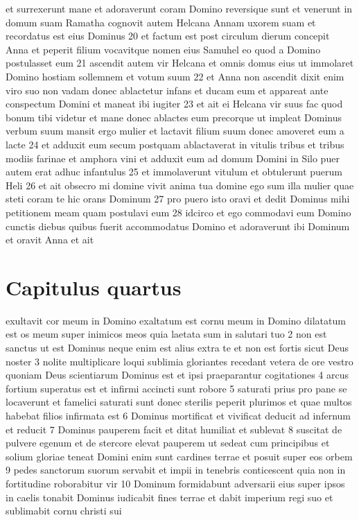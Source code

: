  et surrexerunt mane et adoraverunt coram Domino reversique sunt et venerunt in domum suam Ramatha cognovit autem Helcana Annam uxorem suam et recordatus est eius Dominus  20 et factum est post circulum dierum concepit Anna et peperit filium vocavitque nomen eius Samuhel eo quod a Domino postulasset eum  21 ascendit autem vir Helcana et omnis domus eius ut immolaret Domino hostiam sollemnem et votum suum  22 et Anna non ascendit dixit enim viro suo non vadam donec ablactetur infans et ducam eum et appareat ante conspectum Domini et maneat ibi iugiter  23 et ait ei Helcana vir suus fac quod bonum tibi videtur et mane donec ablactes eum precorque ut impleat Dominus verbum suum mansit ergo mulier et lactavit filium suum donec amoveret eum a lacte  24 et adduxit eum secum postquam ablactaverat in vitulis tribus et tribus modiis farinae et amphora vini et adduxit eum ad domum Domini in Silo puer autem erat adhuc infantulus  25 et immolaverunt vitulum et obtulerunt puerum Heli  26 et ait obsecro mi domine vivit anima tua domine ego sum illa mulier quae steti coram te hic orans Dominum  27 pro puero isto oravi et dedit Dominus mihi petitionem meam quam postulavi eum  28 idcirco et ego commodavi eum Domino cunctis diebus quibus fuerit accommodatus Domino et adoraverunt ibi Dominum et oravit Anna et ait\pend

\endnumbering

\section{Capitulus quartus}

\beginnumbering

 exultavit cor meum in Domino exaltatum est cornu meum in Domino dilatatum est os meum super inimicos meos quia laetata sum in salutari tuo  2 non est sanctus ut est Dominus neque enim est alius extra te et non est fortis sicut Deus noster  3 nolite multiplicare loqui sublimia gloriantes recedant vetera de ore vestro quoniam Deus scientiarum Dominus est et ipsi praeparantur cogitationes  4 arcus fortium superatus est et infirmi accincti sunt robore  5 saturati prius pro pane se locaverunt et famelici saturati sunt donec sterilis peperit plurimos et quae multos habebat filios infirmata est  6 Dominus mortificat et vivificat deducit ad infernum et reducit  7 Dominus pauperem facit et ditat humiliat et sublevat  8 suscitat de pulvere egenum et de stercore elevat pauperem ut sedeat cum principibus et solium gloriae teneat Domini enim sunt cardines terrae et posuit super eos orbem  9 pedes sanctorum suorum servabit et impii in tenebris conticescent quia non in fortitudine roborabitur vir  10 Dominum formidabunt adversarii eius super ipsos in caelis tonabit Dominus iudicabit fines terrae et dabit imperium regi suo et sublimabit cornu christi sui\pend

